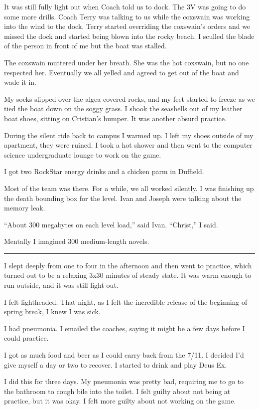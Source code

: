 It was still fully light out when Coach told us to dock.  The 3V was going to do
some more drills.  Coach Terry was talking to us while the coxswain was working
into the wind to the dock.  Terry started overriding the coxswain's orders and
we missed the dock and started being blown into the rocky beach.  I sculled the
blade of the person in front of me but the boat was stalled.

The coxswain muttered under her breath.  She was the hot coxswain, but no one
respected her.  Eventually we all yelled and agreed to get out of the boat and
wade it in.

My socks slipped over the algea-covered rocks, and my feet started to freeze as
we tied the boat down on the soggy grass.  I shook the seashells out of my
leather boat shoes, sitting on Cristian's bumper.  It was another absurd
practice.  

During the silent ride back to campus I warmed up.  I left my shoes outside of
my apartment, they were ruined.  I took a hot shower and then went to the
computer science undergraduate lounge to work on the game.

I got two RockStar energy drinks and a chicken parm in Duffield.

Most of the team was there.  For a while, we all worked silently.  I was
finishing up the death bounding box for the level.  Ivan and Joseph were
talking about the memory leak.

``About 300 megabytes on each level load,'' said Ivan.  ``Christ,'' I said.

Mentally I imagined 300 medium-length novels.

\plainfancybreak{12pt}{2}{* * *}

I slept deeply from one to four in the afternoon and then went to practice,
which turned out to be a relaxing 3x30 minutes of steady state.  It was warm
enough to run outside, and it was still light out.

I felt lightheaded.  That night, as I felt the incredible release of the
beginning of spring break, I knew I was sick.  

I had pneumonia.  I emailed the coaches, saying it might be a few days before I
could practice.  

I got as much food and beer as I could carry back from the 7/11.  I decided I'd
give myself a day or two to recover.  I started to drink and play Deus Ex.  

I did this for three days.  My pneumonia was pretty bad, requiring me to go to
the bathroom to cough bile into the toilet.  I felt guilty about not being at
practice, but it was okay.  I felt more guilty about not working on the game.



